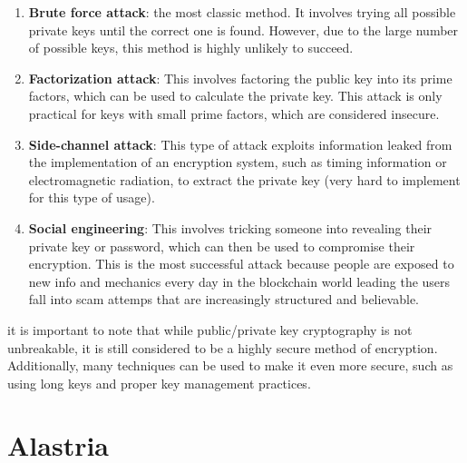 \documentclass[target=mst,aauheader=]{thud}
\begin{document}
    \begin{enumerate}

        \item \textbf{Brute force attack}: the most classic method. It involves trying all possible private keys until the correct one is found. However, due to the large number of possible keys, this method is highly unlikely to succeed.
        \item \textbf{Factorization attack}: This involves factoring the public key into its prime factors, which can be used to calculate the private key. This attack is only practical for keys with small prime factors, which are considered insecure.
        \item \textbf{Side-channel attack}: This type of attack exploits information leaked from the implementation of an encryption system, such as timing information or electromagnetic radiation, to extract the private key (very hard to implement for this type of usage).
        \item \textbf{Social engineering}: This involves tricking someone into revealing their private key or password, which can then be used to compromise their encryption. This is the most successful attack because people are exposed to new info and mechanics every day in the blockchain world leading the users fall into scam attemps that are increasingly structured and believable.

    \end{enumerate}

    it is important to note that while public/private key cryptography is not unbreakable, it is still considered to be a highly secure method of encryption. Additionally, many techniques can be used to make it even more secure, such as using long keys and proper key management practices.
    
    \section{Alastria}
\end{document}
